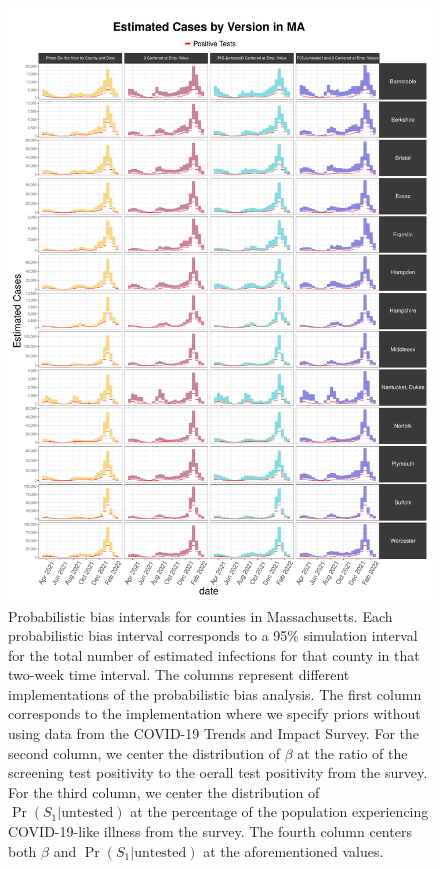 \documentclass[12pt,twoside]{smiththesis}
\begin{document}
~

~

~

~

~
\begin{figure}
\includegraphics[width=1\linewidth]{figure/ma_pb_compared_to_observed} \caption{\label{fig:pb_counts_ma}Probabilistic bias intervals for counties in Massachusetts. Each probabilistic bias interval corresponds to a 95\% simulation interval for the total number of estimated infections for that county in that two-week time interval. The columns represent different implementations of the probabilistic bias analysis. The first column corresponds to the implementation where we specify priors without using data from the COVID-19 Trends and Impact Survey. For the second column, we center the distribution of $\beta$ at the ratio of the screening test positivity to the oerall test positivity from the survey. For the third column, we center the distribution of $\Pr(S_1|\text{untested})$ at the percentage of the population experiencing COVID-19-like illness from the survey. The fourth column centers both  $\beta$ and $\Pr(S_1|\text{untested})$ at the aforementioned values.}\label{fig:unnamed-chunk-78}
\end{figure}
\end{document}
